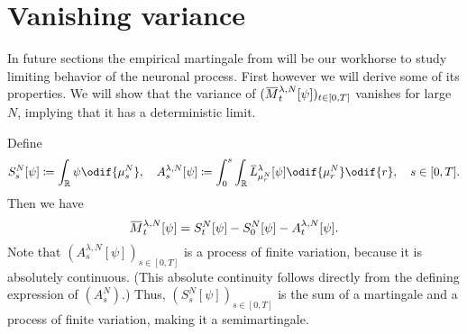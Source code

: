 \section{Vanishing variance}    %

In future sections the empirical martingale from  will be our workhorse to study limiting behavior of the neuronal process.  %
First however we will derive some of its properties.
We will show that the variance of \((\ol{M}_t^{\lambda,N}[\psi])_{t\in[0,T]}\) vanishes for large \(N\), implying that it has a deterministic limit.    %

Define
\begin{equation}
  S_s^N[\psi] \coloneqq \int_\potspace \psi \odif{\mu_s^N},
  \quad
  A_s^{\lambda, N}[\psi] \coloneqq \int_0^s \int_\potspace \ol{L}_{\mu_r^N}^{\lambda} [\psi] \odif{\mu_{r}^N} \odif{r}, \quad s \in [0,T].
\end{equation}
Then we have
\begin{equation}\label{eq:M=S-A}
  \ol{M}_t^{\lambda,N}[\psi] = S_t^N[\psi] - S_0^N[\psi] - A_t^{\lambda,N}[\psi].
\end{equation}
Note that \((A_s^{\lambda, N}[\psi])_{s\in[0,T]}\) is a process of finite variation, because it is absolutely continuous.
(This absolute continuity follows directly from the defining expression of \((A_s^N)\).) %
Thus, \((S_s^N[\psi])_{s\in[0,T]}\) is the sum of a martingale and a process of finite variation, making it a semimartingale.

